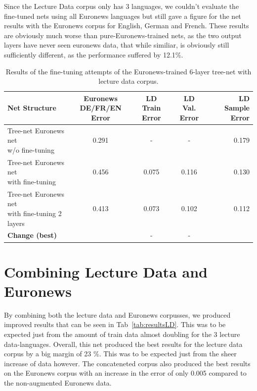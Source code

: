 Since the Lecture Data corpus only has 3 languages, we couldn't evaluate the fine-tuned nets using all Euronews languages but still gave a figure for the net results with the Euronews corpus for English, German and French. These results are obviously much worse than pure-Euronews-trained nets, as the two output layers have never seen euronews data, that while similiar, is obviously still sufficiently different, as the performance suffered by 12.1\%.


\begin{table}
\caption{Results of the fine-tuning attempts of the Euronews-trained 6-layer tree-net with lecture data corpus.}
\label{tab:LIDFine}
\begin{tabular}{| l | c | c | c | r | }
	\hline
	\textbf{Net Structure} & \parbox[t]{2.5cm}{\textbf{Euronews} \\ \textbf{DE/FR/EN Error}} &  \parbox[t]{2.5cm}{\textbf{LD} \\ \textbf{Train Error}} &  \parbox[t]{2.5cm}{\textbf{LD} \\ \textbf{Val. Error}} &  \parbox[t]{2.5cm}{\textbf{LD} \\ \textbf{Sample Error}}  \\
	\hline
	\parbox[t]{5cm}{Tree-net Euronews net \\
	 w/o fine-tuning}  & 0.291 & - & - & 0.179 \\
	\hline
	\parbox[t]{4.2cm}{Tree-net Euronews net \\ with fine-tuning } & 0.456 & 0.075 & 0.116 & 0.130 \\
	\hdashline
	\parbox[t]{4.2cm}{Tree-net Euronews net \\ with fine-tuning 2 layers } & 0.413 & 0.073 & 0.102 & 0.112 \\
	\hline
	\textbf{Change (best)} &  & - & - &  \\
	\hline
\end{tabular}
\end{table}


\section{Combining Lecture Data and Euronews}
\label{sec:LIDNetworkConcat}
By combining both the lecture data and Euronews corpusses, we produced improved results that can be seen in Tab~\ref{tab:resultsLD}. This was to be expected just from the amount of train data almost doubling for the 3 lecture data-languages. Overall, this net produced the best results for the lecture data corpus by a big margin of 23 \%. This was to be expected just from the sheer increase of data however. The concateneted corpus also produced the best results on the Euronews corpus with an increase in the error of only 0.005 compared to the non-augmented Euronews data. 

